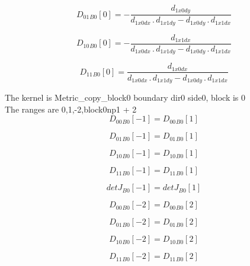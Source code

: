 \documentclass{article}
\begin{document}
\begin{dmath}{D_{01}{_{B0}}}[{0}] = - \frac{d_{1 x0 dy}}{d_{1 x0 dx} \,.\, d_{1 x1 dy} - d_{1 x0 dy} \,.\, d_{1 x1 dx}}\end{dmath}

\begin{dmath}{D_{10}{_{B0}}}[{0}] = - \frac{d_{1 x1 dx}}{d_{1 x0 dx} \,.\, d_{1 x1 dy} - d_{1 x0 dy} \,.\, d_{1 x1 dx}}\end{dmath}

\begin{dmath}{D_{11}{_{B0}}}[{0}] = \frac{d_{1 x0 dx}}{d_{1 x0 dx} \,.\, d_{1 x1 dy} - d_{1 x0 dy} \,.\, d_{1 x1 dx}}\end{dmath}

\noindent The kernel is Metric_copy_block0 boundary dir0 side0, block is 0\\\noindent The ranges are 0,1,-2,block0np1 + 2\\\begin{dmath}{D_{00}{_{B0}}}[{-1}] = {D_{00}{_{B0}}}[{1}]\end{dmath}

\begin{dmath}{D_{01}{_{B0}}}[{-1}] = {D_{01}{_{B0}}}[{1}]\end{dmath}

\begin{dmath}{D_{10}{_{B0}}}[{-1}] = {D_{10}{_{B0}}}[{1}]\end{dmath}

\begin{dmath}{D_{11}{_{B0}}}[{-1}] = {D_{11}{_{B0}}}[{1}]\end{dmath}

\begin{dmath}{detJ{_{B0}}}[{-1}] = {detJ{_{B0}}}[{1}]\end{dmath}

\begin{dmath}{D_{00}{_{B0}}}[{-2}] = {D_{00}{_{B0}}}[{2}]\end{dmath}

\begin{dmath}{D_{01}{_{B0}}}[{-2}] = {D_{01}{_{B0}}}[{2}]\end{dmath}

\begin{dmath}{D_{10}{_{B0}}}[{-2}] = {D_{10}{_{B0}}}[{2}]\end{dmath}

\begin{dmath}{D_{11}{_{B0}}}[{-2}] = {D_{11}{_{B0}}}[{2}]\end{dmath}
\end{document}
